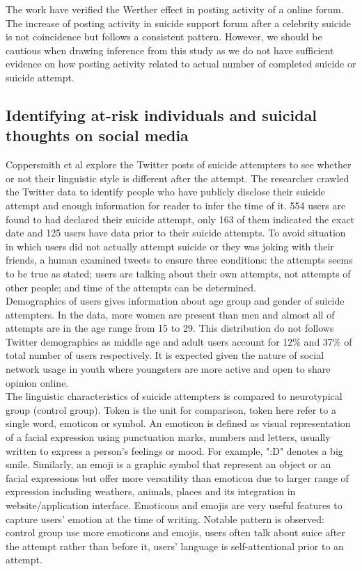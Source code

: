 The work have verified the Werther effect in posting activity of a online forum. The increase of posting activity in suicide support forum after a celebrity suicide is not coincidence but follows a consistent pattern. However, we should be cautious when drawing inference from this study as we do not have sufficient evidence on how posting activity related to actual number of completed suicide or suicide attempt.\\

\subsection{Identifying at-risk individuals and suicidal thoughts on social media}
Coppersmith et al \cite{Coppersmith2016} explore the Twitter posts of suicide attempters to see whether or not their linguistic style is different after the attempt. The researcher crawled the Twitter data to identify people who have publicly disclose their suicide attempt and enough information for reader to infer the time of it. 554 users are found to had declared their suicide attempt, only 163 of them indicated the exact date and 125 users have data prior to their suicide attempts. To avoid situation in which users did not actually attempt suicide or they was joking with their friends, a human examined tweets to ensure three conditions: the attempts seems to be true as stated; users are talking about their own attempts, not attempts of other people; and time of the attempts can be determined.\\
Demographics of users gives information about age group and gender of suicide attempters. In the data, more women are present than men and almost all of attempts are in the age range from 15 to 29. This distribution do not follows Twitter demographics as middle age and adult users account for 12\% and 37\% of total number of users respectively. It is expected given the nature of social network usage in youth where youngsters are more active and open to share opinion online.\\
The linguistic characteristics of suicide attempters is compared to neurotypical group (control group). Token is the unit for comparison, token here refer to a single word, emoticon or symbol. An emoticon is defined as visual representation of a facial expression using punctuation marks, numbers and letters, usually written to express a person's feelings or mood. For example, ":D" denotes a big smile. Similarly, an emoji is a graphic symbol that represent an object or an facial expressions but offer more versatility than emoticon due to larger range of expression including weathers, animals, places and its integration in website/application interface. Emoticons and emojis are very useful features to capture users' emotion at the time of writing. Notable pattern is observed: control group use more emoticons and emojis, users often talk about suice after the attempt rather than before it, users' language is self-attentional prior to an attempt.\\
